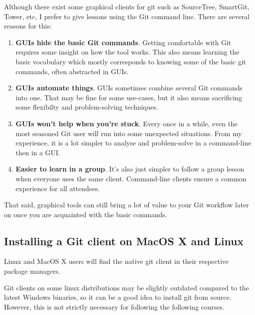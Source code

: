 \documentclass[a4paper]{../../common/tufte-latex/tufte-handout}
\begin{document}
Although there exist some graphical clients for git such as SourceTree, SmartGit, Tower, etc, I prefer to give lessons using the Git command line. There are several reasons for this:

\begin{enumerate} 
 \item{\textbf{GUIs hide the basic Git commands}. Getting comfortable with Git requires some insight on how the tool works. This also means learning the basic vocabulary which mostly corresponds to knowing some of the basic git commands, often abstracted in GUIs.}
 \item{\textbf{GUIs automate things}.  GUIs sometimes combine several Git commands into one.  That may be fine for some use-cases, but it also means sacrificing some flexibilty and problem-solving techniques.}
 \item{\textbf{GUIs won't help when you're stuck}.  Every once in a while, even the most seasoned Git user will run into some unexpected situations. From my experience, it is a lot simpler to analyse and problem-solve in a command-line then in a GUI.}
 \item{\textbf{Easier to learn in a group}. It's also just simpler to follow a group lesson when everyone uses the same client. Command-line clients ensure a common experience for all attendees.}
\end{enumerate}

That said, graphical tools can still bring a lot of value to your Git workflow later on once you are acquainted with the basic commands.

\subsection{Installing a Git client on MacOS X and Linux}

Linux and MacOS X users will find the native git client in their respective package managers.

Git clients on some linux distributions may be slightly outdated compared to the latest Windows binaries,  so it can be a good idea to install git from source. However, this is not strictly necessary for following the following courses.
\end{document}
